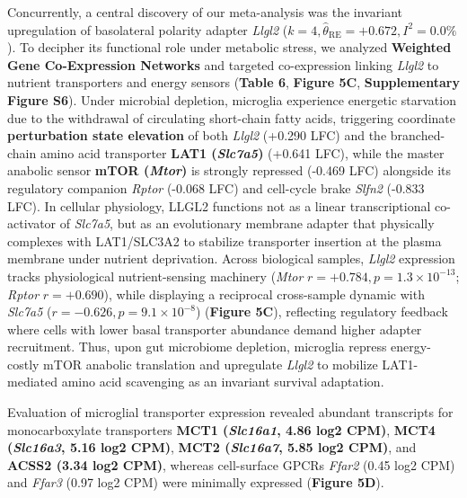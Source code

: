 \documentclass[10pt,a4paper]{article}
\begin{document}
Concurrently, a central discovery of our meta-analysis was the invariant upregulation of basolateral polarity adapter \textit{Llgl2} ($k=4, \hat{\theta}_{\text{RE}} = +0.672, I^2 = 0.0\%$). To decipher its functional role under metabolic stress, we analyzed \textbf{Weighted Gene Co-Expression Networks} and targeted co-expression linking \textit{Llgl2} to nutrient transporters and energy sensors (\textbf{Table 6}, \textbf{Figure 5C}, \textbf{Supplementary Figure S6}). Under microbial depletion, microglia experience energetic starvation due to the withdrawal of circulating short-chain fatty acids, triggering coordinate \textbf{perturbation state elevation} of both \textit{Llgl2} (+0.290 LFC) and the branched-chain amino acid transporter \textbf{LAT1 (\textit{Slc7a5})} (+0.641 LFC), while the master anabolic sensor \textbf{mTOR (\textit{Mtor})} is strongly repressed (-0.469 LFC) alongside its regulatory companion \textit{Rptor} (-0.068 LFC) and cell-cycle brake \textit{Slfn2} (-0.833 LFC). In cellular physiology, LLGL2 functions not as a linear transcriptional co-activator of \textit{Slc7a5}, but as an evolutionary membrane adapter that physically complexes with LAT1/SLC3A2 to stabilize transporter insertion at the plasma membrane under nutrient deprivation\cite{saito2019_26,bilder2000_27}. Across biological samples, \textit{Llgl2} expression tracks physiological nutrient-sensing machinery (\textit{Mtor} $r = +0.784, p = 1.3 \times 10^{-13}$; \textit{Rptor} $r = +0.690$), while displaying a reciprocal cross-sample dynamic with \textit{Slc7a5} ($r = -0.626, p = 9.1 \times 10^{-8}$) (\textbf{Figure 5C}), reflecting regulatory feedback where cells with lower basal transporter abundance demand higher adapter recruitment. Thus, upon gut microbiome depletion, microglia repress energy-costly mTOR anabolic translation and upregulate \textit{Llgl2} to mobilize LAT1-mediated amino acid scavenging as an invariant survival adaptation.

Evaluation of microglial transporter expression revealed abundant transcripts for monocarboxylate transporters \textbf{MCT1 (\textit{Slc16a1}, 4.86 log2 CPM)}, \textbf{MCT4 (\textit{Slc16a3}, 5.16 log2 CPM)}, \textbf{MCT2 (\textit{Slc16a7}, 5.85 log2 CPM)}, and \textbf{ACSS2 (3.34 log2 CPM)}, whereas cell-surface GPCRs \textit{Ffar2} (0.45 log2 CPM) and \textit{Ffar3} (0.97 log2 CPM) were minimally expressed (\textbf{Figure 5D}).
\end{document}
